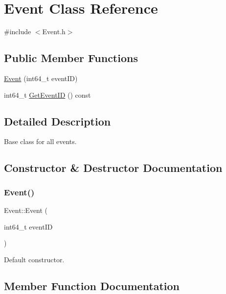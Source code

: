 \hypertarget{class_event}{}\section{Event Class Reference}
\label{class_event}


{\ttfamily \#include $<$Event.\+h$>$}

\subsection*{Public Member Functions}
\begin{DoxyCompactItemize}
\item 
\mbox{\hyperlink{class_event_ab7d875af219d0d97a3b1173b576bf65a}{Event}} (int64\+\_\+t event\+ID)
\item 
int64\+\_\+t \mbox{\hyperlink{class_event_a49eec72ca49bb73e1d28a09db8babadd}{Get\+Event\+ID}} () const
\end{DoxyCompactItemize}


\subsection{Detailed Description}
Base class for all events. 

\subsection{Constructor \& Destructor Documentation}
\mbox{\label{class_event_ab7d875af219d0d97a3b1173b576bf65a}} 
\subsubsection{\texorpdfstring{Event()}{Event()}}
{\footnotesize\ttfamily Event\+::\+Event (\begin{DoxyParamCaption}\item[{int64\+\_\+t}]{event\+ID }\end{DoxyParamCaption})}

Default constructor. 

\subsection{Member Function Documentation}
\mbox{\label{class_event_a49eec72ca49bb73e1d28a09db8babadd}} 
